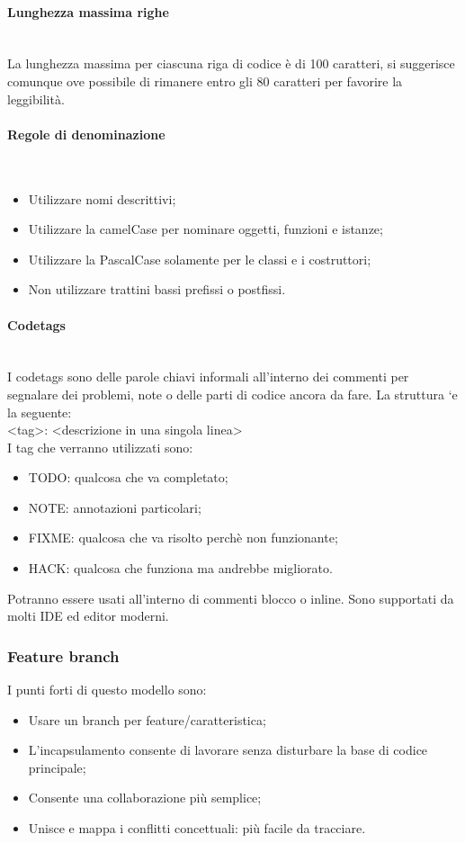 \paragraph{Lunghezza massima righe}\mbox{}\\
La lunghezza massima per ciascuna riga di codice è di 100 caratteri, si suggerisce comunque
ove possibile di rimanere entro gli 80 caratteri per favorire la leggibilità.

\paragraph{Regole di denominazione}\mbox{}\\
\begin{itemize}
\item Utilizzare nomi descrittivi;
\item Utilizzare la camelCase per nominare oggetti, funzioni e istanze;
\item Utilizzare la PascalCase solamente per le classi e i costruttori;
\item Non utilizzare trattini bassi prefissi o postfissi.
\end{itemize}

\paragraph{Codetags}\mbox{}\\
I codetags sono delle parole chiavi informali all'interno dei commenti per segnalare
dei problemi, note o delle parti di codice ancora da fare. La struttura `e la seguente: \\
<tag>: <descrizione in una singola linea>\\
I tag che verranno utilizzati sono:\\
\begin{itemize}
\item TODO: qualcosa che va completato;
\item NOTE: annotazioni particolari;
\item FIXME: qualcosa che va risolto perchè non funzionante;
\item HACK: qualcosa che funziona ma andrebbe migliorato.
\end{itemize}
Potranno essere usati all’interno di commenti blocco o inline. Sono supportati da
molti IDE ed editor moderni.

\subsubsection{Feature branch}
I punti forti di questo modello sono:\\
\begin{itemize}
\item Usare un branch per feature/caratteristica;
\item L'incapsulamento consente di lavorare senza disturbare la base di codice principale;
\item Consente una collaborazione più semplice;
\item Unisce e mappa i conflitti concettuali: più facile da tracciare.
\end{itemize}
